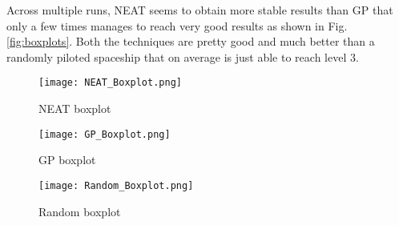 Across multiple runs, NEAT seems to obtain more stable results than GP that only a few
times manages to reach very good results as shown in Fig. \ref{fig:boxplots}. Both the techniques are
pretty good and much better than a randomly piloted spaceship that on average is just able
to reach level 3.


\begin{figure*}
    \centering
    \begin{subfigure}[b]{0.3\textwidth}
        \centering
        \texttt{[image: NEAT\_Boxplot.png]}
        \caption{NEAT boxplot}
    \end{subfigure}
    \hspace{3mm}
    \begin{subfigure}[b]{0.3\textwidth}
        \centering
        \texttt{[image: GP\_Boxplot.png]}
        \caption{GP boxplot}
    \end{subfigure}
    \hspace{3mm}
    \begin{subfigure}[b]{0.3\textwidth}
        \centering
        \texttt{[image: Random\_Boxplot.png]}
        \caption{Random boxplot}
    \end{subfigure}
       \caption{Comparison between boxplots of NEAT, GP and randomly piloted spaceships.}
       \label{fig:boxplots}
\end{figure*}